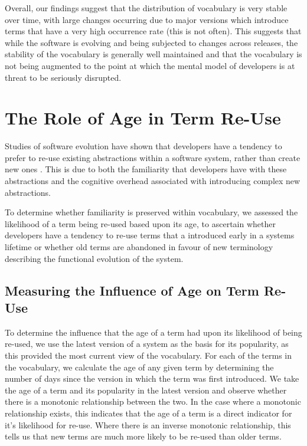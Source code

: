 Overall, our findings suggest that the distribution of vocabulary is very stable over time, with large changes occurring due to major versions which introduce terms that have a very high occurrence rate (this is not often). This suggests that while the software is evolving and being subjected to changes across releases, the stability of the vocabulary is generally well maintained and that the vocabulary is not being augmented to the point at which the mental model of developers is at threat to be seriously disrupted.



\section{The Role of Age in Term Re-Use} %
\label{sec:the_role_of_age_in_term_re_use}

Studies of software evolution have shown that developers have a tendency to prefer to re-use existing abstractions within a software system, rather than create new ones \cite{Vasa09a}. This is due to both the familiarity that developers have with these abstractions and the cognitive overhead associated with introducing complex new abstractions.

To determine whether familiarity is preserved within vocabulary, we assessed the likelihood of a term being re-used based upon its age, to ascertain whether developers have a tendency to re-use terms that a introduced early in a systems lifetime or whether old terms are abandoned in favour of new terminology describing the functional evolution of the system.


\subsection{Measuring the Influence of Age on Term Re-Use} %
\label{sub:measuring_the_influence_of_age_on_term_re_use}

To determine the influence that the age of a term had upon its likelihood of being re-used, we use the latest version of a system as the basis for its popularity, as this provided the most current view of the vocabulary. For each of the terms in the vocabulary, we calculate the age of any given term by determining the number of days since the version in which the term was first introduced. We take the age of a term and its popularity in the latest version and observe whether there is a monotonic relationship between the two. In the case where a monotonic relationship exists, this indicates that the age of a term is a direct indicator for it's likelihood for re-use. Where there is an inverse monotonic relationship, this tells us that new terms are much more likely to be re-used than older terms.

